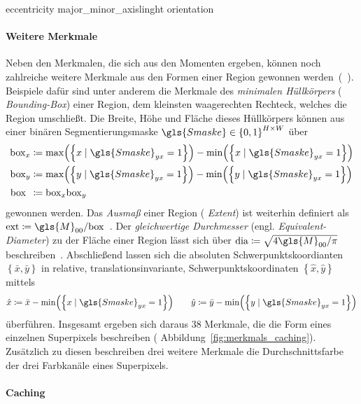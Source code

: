 
\cite{Siedhoff}
eccentricity
major\_minor\_axislinght
orientation

\paragraph{Weitere Merkmale}
\label{weitere_merkmale}

Neben den Merkmalen, die sich aus den Momenten ergeben, können noch zahlreiche weitere Merkmale aus den Formen einer Region gewonnen werden~(\vgl{}~\cite{Siedhoff}).
Beispiele dafür sind unter anderem die Merkmale des \emph{minimalen Hüllkörpers} (\engl{} \emph{Bounding-Box}) einer Region, \dhe{} dem kleinsten waagerechten Rechteck, welches die Region umschließt.
Die Breite, Höhe und Fläche dieses Hüllkörpers können aus einer binären Segmentierungsmaske $\gls{Smaske} \in {\left\{0,1\right\}}^{H \times W}$ über
\begin{equation*}
\begin{split}
  \mathrm{box}_x & \coloneqq \max\left(\left\{x \mid \gls{Smaske}_{yx} = 1\right\}\right) - \min\left(\left\{x \mid \gls{Smaske}_{yx} = 1\right\}\right)\\
  \mathrm{box}_y & \coloneqq \max\left(\left\{y \mid \gls{Smaske}_{yx} = 1\right\}\right) - \min\left(\left\{y \mid \gls{Smaske}_{yx} = 1\right\}\right)\\
  \mathrm{box}_{\,\,\,} & \coloneqq \mathrm{box}_x \mathrm{box}_y
\end{split}
\end{equation*}
gewonnen werden.
Das \emph{Ausmaß} einer Region (\engl{} \emph{Extent}) ist weiterhin definiert als $\mathrm{ext} \coloneqq \gls{M}_{00}/\mathrm{box}$~\cite{Siedhoff}.
Der \emph{gleichwertige Durchmesser} (engl. \emph{Equivalent-Di\-a\-me\-ter}) zu der Fläche einer Region lässt sich über $\mathrm{dia} \coloneqq \sqrt{4 \gls{M}_{00}/\pi}$ beschreiben~\cite{Siedhoff}.
Abschließend lassen sich die absoluten Schwerpunktskoordianten $\left\{\bar{x}, \bar{y}\right\}$ in relative, \dhe{} translationsinvariante, Schwerpunktskoordinaten $\left\{\hat{x}, \hat{y}\right\}$ mittels
\begin{equation*}
  \hat{x} \coloneqq \bar{x} - \min\left(\left\{x \mid \gls{Smaske}_{yx} = 1\right\}\right)
  \qquad
  \hat{y} \coloneqq \bar{y} - \min\left(\left\{y \mid \gls{Smaske}_{yx} = 1\right\}\right)
\end{equation*}
überführen.
Insgesamt ergeben sich daraus $38$ Merkmale, die die Form eines einzelnen Superpixels beschreiben (\vgl{} Abbildung~\ref{fig:merkmals_caching}).
Zusätzlich zu diesen beschreiben drei weitere Merkmale die Durchschnittsfarbe der drei Farbkanäle eines Superpixels.

\paragraph{Caching}
\label{Caching}



